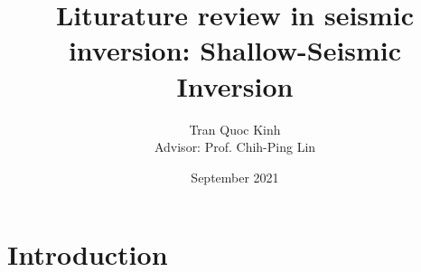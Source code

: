 \documentclass[12]{report}
\title{\huge Liturature review in seismic inversion: Shallow-Seismic Inversion}
\author{\large Tran Quoc Kinh \\ Advisor: Prof. Chih-Ping Lin}
\date{September 2021}
\begin{document}
\maketitle

\chapter*{Introduction}

\end{document}

